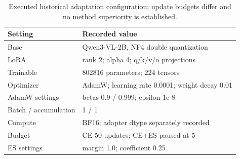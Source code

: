 \begin{table}[t]
\centering\small
\caption{Executed historical adaptation configuration; update budgets differ and no method superiority is established.}
\label{tab:t5_training_configuration}
\begin{tabularx}{\linewidth}{lX}
\toprule
Setting & Recorded value \\ \midrule
Base & Qwen3-VL-2B, NF4 double quantization \\
LoRA & rank 2; alpha 4; q/k/v/o projections \\
Trainable & 802816 parameters; 224 tensors \\
Optimizer & AdamW; learning rate 0.0001; weight decay 0.01 \\
AdamW settings & betas 0.9 / 0.999; epsilon 1e-8 \\
Batch / accumulation & 1 / 1 \\
Compute & BF16; adapter dtype separately recorded \\
Budget & CE 50 updates; CE+ES paused at 5 \\
ES settings & margin 1.0; coefficient 0.25 \\
\bottomrule
\end{tabularx}
\end{table}
